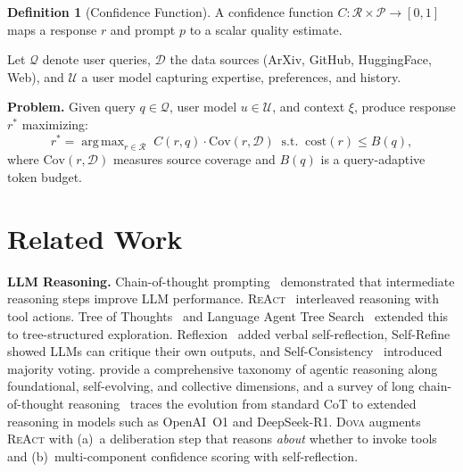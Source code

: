 \documentclass{article}
\theoremstyle{plain}
\theoremstyle{definition}
\newtheorem{definition}[theorem]{Definition}
\newcommand{\dova}{\textsc{Dova}}
\newcommand{\react}{\textsc{ReAct}}
\DeclareMathOperator*{\argmax}{arg\,max}
\begin{document}
\begin{definition}[Confidence Function]
A confidence function $C\!: \mathcal{R} \times \mathcal{P} \to [0, 1]$ maps a
response $r$ and prompt $p$ to a scalar quality estimate.
\end{definition}

Let $\mathcal{Q}$ denote user queries, $\mathcal{D}$ the data sources
(ArXiv, GitHub, HuggingFace, Web), and $\mathcal{U}$ a user model capturing
expertise, preferences, and history.

\textbf{Problem.}
Given query $q \in \mathcal{Q}$, user model $u \in \mathcal{U}$, and context
$\xi$, produce response $r^*$ maximizing:
\begin{equation}\label{eq:objective}
  r^* = \argmax_{r \in \mathcal{R}} \; C(r, q) \cdot \mathrm{Cov}(r, \mathcal{D})
  \;\; \text{s.t.} \;\;
  \mathrm{cost}(r) \leq B(q),
\end{equation}
where $\mathrm{Cov}(r, \mathcal{D})$ measures source coverage and $B(q)$ is a
query-adaptive token budget.

\section{Related Work}\label{sec:related}

\textbf{LLM Reasoning.}\quad
Chain-of-thought prompting~\citep{wei2022chain} demonstrated that intermediate
reasoning steps improve LLM performance.
\react{}~\citep{yao2023react} interleaved reasoning with tool actions.
Tree of Thoughts~\citep{yao2023tree} and Language Agent Tree
Search~\citep{zhou2023lats} extended this to tree-structured exploration.
Reflexion~\citep{shinn2023reflexion} added verbal self-reflection,
Self-Refine~\citep{madaan2023selfrefine} showed LLMs can critique their own
outputs, and Self-Consistency~\citep{wang2023selfconsistency} introduced
majority voting.  \citet{wei2026agentic} provide a comprehensive taxonomy of agentic reasoning
along foundational, self-evolving, and collective dimensions, and
a survey of long chain-of-thought reasoning~\citep{chen2025longcot} traces the
evolution from standard CoT to extended reasoning in models such as OpenAI~O1 and
DeepSeek-R1.
\dova{} augments \react{} with (a)~a deliberation step
that reasons \emph{about} whether to invoke tools and (b)~multi-component
confidence scoring with self-reflection.
\end{document}
